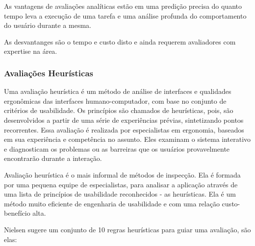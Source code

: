As vantagens de avaliações analíticas estão em uma predição precisa do quanto tempo leva a execução de uma tarefa e uma análise profunda do comportamento do usuário durante a mesma.

As desvantanges são o tempo e custo disto e ainda requerem avaliadores com expertise na área.
\cite{andreas_holzinger}

\subsubsection{Avaliações Heurísticas}

Uma avaliação heurística é um método de análise de interfaces e qualidades ergonômicas das interfaces humano-computador, com base no conjunto de critérios de usabilidade.  Os princípios são chamados de heurísticas, pois, são desenvolvidos a partir de uma série de experiências prévias, sintetizando pontos recorrentes. Essa avaliação é realizada por especialistas em ergonomia, baseados em sua experiência e competência no assunto. Eles examinam o sistema interativo e diagnosticam os problemas ou as barreiras que os usuários provavelmente encontrarão durante a interação.
\cite{cybil_apostila}

Avaliação heurística é o mais informal de métodos de inspecção. Ela é formada por uma pequena equipe de especialistas, para analisar a aplicação através de uma lista de princípios de usabilidade reconhecidos - as heurísticas. Ela é um método muito eficiente de engenharia de usabilidade e com uma relação custo-benefício alta.

Nielsen \cite{nielsen_95} sugere um conjunto de 10 regras heurísticas para guiar uma avaliação, são elas:

